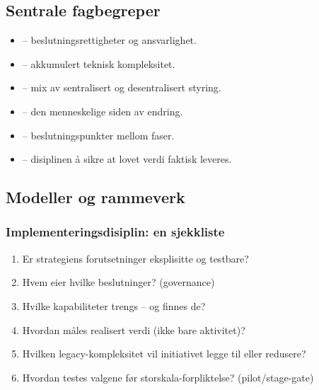 \subsection{Sentrale fagbegreper}
\begin{itemize}
  \item {} -- beslutningsrettigheter og ansvarlighet.
  \item {} -- akkumulert teknisk kompleksitet.
  \item {} -- mix av sentralisert og desentralisert
    styring.
  \item {} -- den menneskelige siden av endring.
  \item {} -- beslutningspunkter mellom faser.
  \item {} -- disiplinen å sikre at lovet verdi faktisk
    leveres.
\end{itemize}

\subsection{Modeller og rammeverk}



\subsubsection*{Implementeringsdisiplin: en sjekkliste}
\begin{enumerate}
  \item Er strategiens forutsetninger eksplisitte og testbare?
  \item Hvem eier hvilke beslutninger? (governance)
  \item Hvilke kapabiliteter trengs -- og finnes de?
  \item Hvordan måles realisert verdi (ikke bare aktivitet)?
  \item Hvilken legacy-kompleksitet vil initiativet legge til eller redusere?
  \item Hvordan testes valgene før storskala-forpliktelse? (pilot/stage-gate)
\end{enumerate}


